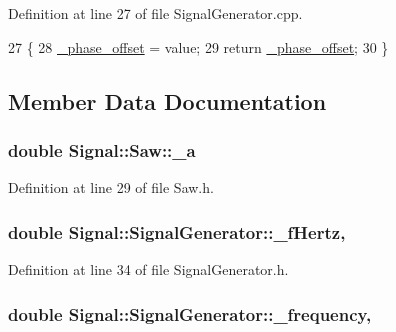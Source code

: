 Definition at line 27 of file Signal\+Generator.\+cpp.


\begin{DoxyCode}
27                                                                    \{
28     \hyperlink{class_signal_1_1_signal_generator_a6b4444d46747c8517171edbbf4b5588f}{\_phase\_offset} = value;
29     \textcolor{keywordflow}{return} \hyperlink{class_signal_1_1_signal_generator_a6b4444d46747c8517171edbbf4b5588f}{\_phase\_offset};
30 \}
\end{DoxyCode}


\subsection{Member Data Documentation}
\hypertarget{class_signal_1_1_saw_a190de681addc384749845750897859e5}{
\subsubsection[{\+\_\+a}]{\setlength{\rightskip}{0pt plus 5cm}double Signal\+::\+Saw\+::\+\_\+a\hspace{0.3cm}{\ttfamily [protected]}}}\label{class_signal_1_1_saw_a190de681addc384749845750897859e5}


Definition at line 29 of file Saw.\+h.

\hypertarget{class_signal_1_1_signal_generator_a85a4702347352bab1c71e0a8df8437d6}{
\subsubsection[{\+\_\+f\+Hertz}]{\setlength{\rightskip}{0pt plus 5cm}double Signal\+::\+Signal\+Generator\+::\+\_\+f\+Hertz\hspace{0.3cm}{\ttfamily [protected]}, {\ttfamily [inherited]}}}\label{class_signal_1_1_signal_generator_a85a4702347352bab1c71e0a8df8437d6}


Definition at line 34 of file Signal\+Generator.\+h.

\hypertarget{class_signal_1_1_signal_generator_a7f107461333bce68c5dad412db96a8c2}{
\subsubsection[{\+\_\+frequency}]{\setlength{\rightskip}{0pt plus 5cm}double Signal\+::\+Signal\+Generator\+::\+\_\+frequency\hspace{0.3cm}{\ttfamily [protected]}, {\ttfamily [inherited]}}}\label{class_signal_1_1_signal_generator_a7f107461333bce68c5dad412db96a8c2}


